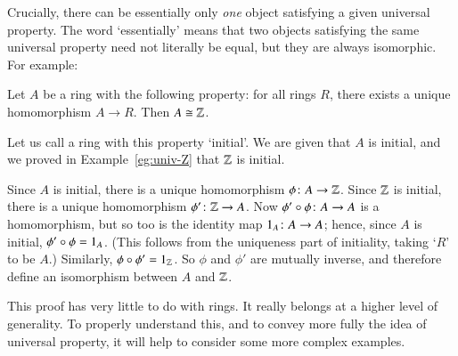 Crucially, there can be essentially only \emph{one} object satisfying a
given universal property.  The word `essentially' means that two objects
satisfying the same universal property need not literally be equal, but
they are always isomorphic.  For example:

\begin{ilemma}
\label{lemma:Z-unique}
%
%
Let $A$ be a ring with the following property: for all rings $R$, there exists
a unique homomorphism $A \to R$.  Then $A \cong \mathbb{Z}$.
\end{ilemma}

\begin{pf}
Let us call a ring with this property `initial'.  We are given that $A$
is initial, and we proved in Example~\ref{eg:univ-Z} that $\mathbb{Z}$ is
initial.

Since $A$ is initial, there is a unique homomorphism $\phi\from A \to
\integers$.  Since $\mathbb{Z}$ is initial, there is a unique homomorphism
$\phi'\from \integers \to A$.  Now $\phi' \of \phi \from A \to A$ is a
homomorphism, but so too is the identity map $1_A\from A \to A$; hence,
since $A$ is initial, $\phi' \mathbin{\circ} \phi = 1_A$.  (This follows from the
uniqueness part of initiality, taking `$R$' to be $A$.)  Similarly, $\phi
\mathbin{\circ} \phi' = 1_{\mathbb{Z}}$.  So $\phi$ and $\phi'$ are mutually inverse, and
therefore define an isomorphism between $A$ and $\mathbb{Z}$.
\end{pf}

This proof has very little to do with rings.  It really belongs at a higher
level of generality.  To properly understand this, and to convey more fully
the idea of universal property, it will help to consider some more
complex examples.


